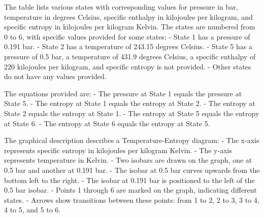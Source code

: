 The table lists various states with corresponding values for pressure in bar, temperature in degrees Celsius, specific enthalpy in kilojoules per kilogram, and specific entropy in kilojoules per kilogram Kelvin. The states are numbered from 0 to 6, with specific values provided for some states:
- State 1 has a pressure of 0.191 bar.
- State 2 has a temperature of 243.15 degrees Celsius.
- State 5 has a pressure of 0.5 bar, a temperature of 431.9 degrees Celsius, a specific enthalpy of 220 kilojoules per kilogram, and specific entropy is not provided.
- Other states do not have any values provided.

The equations provided are:
- The pressure at State 1 equals the pressure at State 5.
- The entropy at State 1 equals the entropy at State 2.
- The entropy at State 2 equals the entropy at State 1.
- The entropy at State 5 equals the entropy at State 6.
- The entropy at State 6 equals the entropy at State 5.

The graphical description describes a Temperature-Entropy diagram:
- The x-axis represents specific entropy in kilojoules per kilogram Kelvin.
- The y-axis represents temperature in Kelvin.
- Two isobars are drawn on the graph, one at 0.5 bar and another at 0.191 bar.
- The isobar at 0.5 bar curves upwards from the bottom left to the right.
- The isobar at 0.191 bar is positioned to the left of the 0.5 bar isobar.
- Points 1 through 6 are marked on the graph, indicating different states.
- Arrows show transitions between these points: from 1 to 2, 2 to 3, 3 to 4, 4 to 5, and 5 to 6.